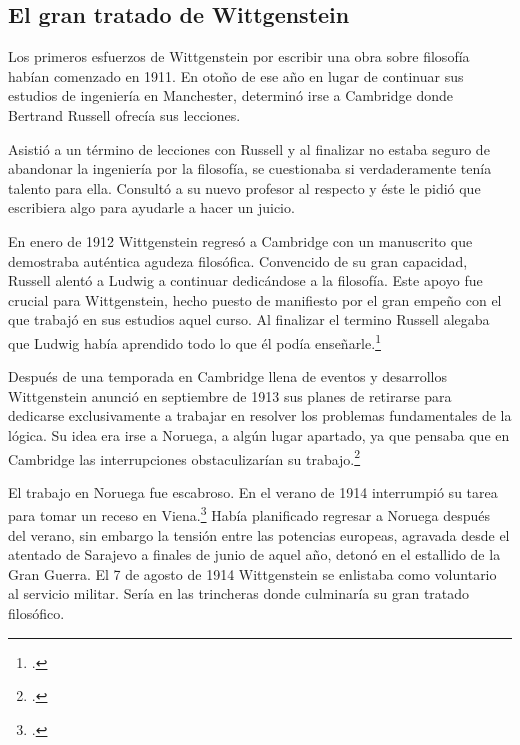     \subsection{El gran tratado de Wittgenstein}


    Los primeros esfuerzos de Wittgenstein por escribir una obra sobre filosofía
    habían comenzado en 1911. En otoño de ese año en lugar de continuar sus estudios
    de ingeniería en Manchester, determinó irse a Cambridge donde Bertrand Russell
    ofrecía sus lecciones.

    Asistió a un término de lecciones con Russell y al finalizar no estaba seguro de
    abandonar la ingeniería por la filosofía, se cuestionaba si verdaderamente tenía
    talento para ella. Consultó a su nuevo profesor al respecto y éste le pidió que
    escribiera algo para ayudarle a hacer un juicio. 

    En enero de 1912 Wittgenstein regresó a Cambridge con un manuscrito que
    demostraba auténtica agudeza filosófica. Convencido de su gran capacidad,
    Russell alentó a Ludwig a continuar dedicándose a la filosofía. Este
    apoyo fue crucial para Wittgenstein, hecho puesto de manifiesto por el gran
    empeño con el que trabajó en sus estudios aquel curso. Al finalizar el termino
    Russell alegaba que Ludwig había aprendido todo lo que él podía
    enseñarle.\footcite[cap. 3 loc 865]{monk} 

    Después de una temporada en Cambridge llena de eventos y desarrollos
    Wittgenstein anunció en septiembre de 1913 sus planes de retirarse para
    dedicarse exclusivamente a trabajar en resolver los problemas fundamentales de
    la lógica. Su idea era irse a Noruega, a algún lugar apartado, ya que pensaba
    que en Cambridge las interrupciones obstaculizarían su trabajo.\footcite[cap. 4
    loc 1844]{monk} 

    El trabajo en Noruega fue escabroso. En el verano de 1914 interrumpió su tarea
    para tomar un receso en Viena.\footcite[cap. 5 loc 2154]{monk} Había planificado
    regresar a Noruega después del verano, sin embargo la tensión entre las
    potencias europeas, agravada desde el atentado de Sarajevo a finales de junio de
    aquel año, detonó en el estallido de la Gran Guerra. El 7 de agosto de 1914
    Wittgenstein se enlistaba como voluntario al servicio militar. Sería en las
    trincheras donde culminaría su gran tratado filosófico.


